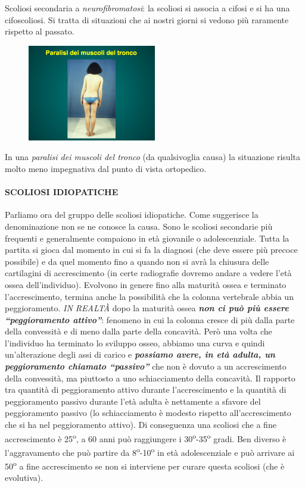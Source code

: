 Scoliosi secondaria a \emph{neurofibromatosi}: la scoliosi si associa a
cifosi e si ha una cifoscoliosi. Si tratta di situazioni che ai nostri
giorni si vedono più raramente rispetto al passato.

\begin{figure}[!ht]
\centering
	\includegraphics[width=0.5\textwidth]{012/image13.png}
\end{figure}
In una \emph{paralisi dei muscoli del tronco} (da qualsivoglia causa) la
situazione risulta molto meno impegnativa dal punto di vista ortopedico.

\paragraph{SCOLIOSI IDIOPATICHE}


Parliamo ora del gruppo delle scoliosi idiopatiche. Come suggerisce la
denominazione non se ne conosce la causa. Sono le scoliosi secondarie
più frequenti e generalmente compaiono in età giovanile o
adolescenziale. Tutta la partita si gioca dal momento in cui si fa la
diagnosi (che deve essere più precoce possibile) e da quel momento fino
a quando non si avrà la chiusura delle cartilagini di accrescimento (in
certe radiografie dovremo andare a vedere l'età ossea dell'individuo).
Evolvono in genere fino alla maturità ossea e terminato l'accrescimento,
termina anche la possibilità che la colonna vertebrale abbia un
peggioramento. \emph{IN REALTÀ} dopo la maturità ossea \textbf{\emph{non
ci può più essere ``\emph{peggioramento attivo''}}}: fenomeno in cui la
colonna cresce di più dalla parte della convessità e di meno dalla parte
della concavità. Però una volta che l'individuo ha terminato lo sviluppo
osseo, abbiamo una curva e quindi un'alterazione degli assi di carico e
\textbf{\emph{possiamo avere, in età adulta, un \emph{peggioramento}
chiamato ``\emph{passivo''}}} che non è dovuto a un accrescimento della
convessità, ma piuttosto a uno schiacciamento della concavità. Il
rapporto tra quantità di peggioramento attivo durante l'accrescimento e
la quantità di peggioramento passivo durante l'età adulta è nettamente a
sfavore del peggioramento passivo (lo schiacciamento è modesto rispetto
all'accrescimento che si ha nel peggioramento attivo). Di conseguenza
una scoliosi che a fine accrescimento è 25\textsuperscript{o}, a 60 anni può raggiungere i
30\textsuperscript{o}-35\textsuperscript{o} gradi. Ben diverso è l'aggravamento che può partire da 8\textsuperscript{o}-10\textsuperscript{o} in
età adolescenziale e può arrivare ai 50\textsuperscript{o} a fine accrescimento se non si
interviene per curare questa scoliosi (che è evolutiva).

